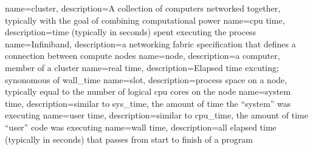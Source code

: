 {
    name=cluster,
    description={A collection of computers networked together, typically with
    the goal of combining computational power}
}
{
    name=\gls{cpu} time,
    description={time (typically in seconds) spent executing the process}
}
{
    name=Infiniband,
    description={a networking fabric specification that defines a connection
    between compute nodes}
}
{
    name=node,
    description={a computer, member of a \gls{cluster}}
}
{
    name=real time,
    description={Elapsed time excuting; synonomous of \gls{wall_time}}
}
{
    name=slot,
    description={process space on a \gls{node}, typically equal to the number
    of logical \gls{cpu} cores on the node}
}
{
    name=system time,
    description={similar to \gls{sys_time}, the amount of time the ``system''
    was executing}
}
{
    name=user time,
    description={similar to \gls{cpu_time}, the amount of time ``user'' code
    was executing}
}
{
    name=wall time,
    description={all elapsed time (typically in seconds) that passes from start
    to finish of a program}
}
